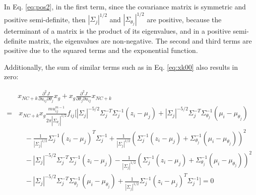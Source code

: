 \documentclass{article}
\begin{document}
In Eq. \ref{eq:pos2}, in the first term, since the covariance matrix is symmetric and positive semi-definite, then \( |\Sigma_j|^{1/2} \) and \( |\Sigma_{\theta_j}|^{1/2} \) are positive, because the determinant of a matrix is the product of its eigenvalues, and in a positive semi-definite matrix, the eigenvalues are non-negative. The second and third terms are positive due to the squared terms and the exponential function.

Additionally, the sum of similar terms such as in Eq. \ref{eq:xk00} also results in zero:

\begin{equation}
\begin{aligned}
& x_{NC+k} \frac{\partial^2 J}{\partial u_{ij} \partial \theta_j} x_g + x_g \frac{\partial^2 J}{\partial \theta_j \partial u_{ij}} x_{NC+k} \\
= & \, x_{NC+k} x_g \frac{m u_{ij}^{m-1}}{2\pi |\Sigma_{\theta_j}|^{1/2}} f_{ij} \Bigg[ |\Sigma_j|^{-5/2} \Sigma_j^{-T} \Sigma_j^{-1} (z_i - \mu_j) + |\Sigma_j|^{-5/2} \Sigma_j^{-T} \Sigma_{\theta_j}^{-1} (\mu_i - \mu_{\theta_j}) \\
& \quad - \frac{1}{|\Sigma_j|^{1/2}} \Sigma_j^{-1} (z_i - \mu_j)^T \Sigma_j^{-1} + \frac{1}{|\Sigma_j|^{1/2}} \left( \Sigma_j^{-1}(z_i - \mu_j) + \Sigma_{\theta_j}^{-1}(\mu_i - \mu_{\theta_j}) \right)^2 \\
& \quad - |\Sigma_j|^{-5/2} \Sigma_j^{-T} \Sigma_j^{-1}(z_i - \mu_j) - \frac{1}{|\Sigma_j|^{1/2}} \left( \Sigma_j^{-1}(z_i - \mu_j) + \Sigma_{\theta_j}^{-1}(\mu_i - \mu_{\theta_j}) \right)^2 \\
& \quad - |\Sigma_j|^{-5/2} \Sigma_j^{-T} \Sigma_{\theta_j}^{-1}(\mu_i - \mu_{\theta_j}) + \frac{1}{|\Sigma_j|^{1/2}} \Sigma_j^{-1}(z_i - \mu_j)^T \Sigma_j^{-1} \Bigg] = 0
\end{aligned}
\end{equation}
\end{document}
